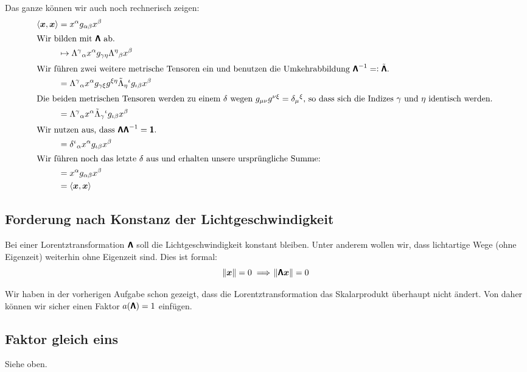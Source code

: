 Das ganze können wir auch noch rechnerisch zeigen:
\begin{align*}
	\inner{\vec x}{\vec x}
	&= x^\alpha g_{\alpha \beta} x^\beta \\
	\intertext{Wir bilden mit $\tens \Lambda$ ab.}
	&\mapsto \Lambda^\gamma{}_\alpha x^\alpha g_{\gamma \eta}
	\Lambda^\eta{}_\beta x^\beta \\
	\intertext{%
		Wir führen zwei weitere metrische Tensoren ein und benutzen die
		Umkehrabbildung $\tens \Lambda^{-1} =: \tilde{\tens \Lambda}$.
	}
	&= \Lambda^\gamma{}_\alpha x^\alpha g_{\gamma \xi} g^{\xi \eta}
	\tilde\Lambda_\eta{}^\iota g_{\iota\beta} x^\beta \\
	\intertext{%
		Die beiden metrischen Tensoren werden zu einem $\delta$ wegen
		$g_{\mu\nu} g^{\nu\xi} = \delta_\mu{}^\xi$, so dass sich die Indizes
		$\gamma$ und $\eta$ identisch werden.
	}
	&= \Lambda^\gamma{}_\alpha x^\alpha \tilde\Lambda_\gamma{}^\iota
	g_{\iota\beta} x^\beta \\
	\intertext{%
		Wir nutzen aus, dass $\tens \Lambda \tens \Lambda^{-1} = \tens 1$.
	}
	&= \delta^\iota{}_\alpha x^\alpha g_{\iota\beta} x^\beta \\
	\intertext{%
		Wir führen noch das letzte $\delta$ aus und erhalten unsere
		ursprüngliche Summe:
	}
	&= x^\alpha g_{\alpha\beta} x^\beta \\
	&= \inner{\vec x}{\vec x}
\end{align*}

\subsection{Forderung nach Konstanz der Lichtgeschwindigkeit}

Bei einer Lorentztransformation $\boldsymbol{\mathsf{\Lambda}}$ soll die Lichtgeschwindigkeit
konstant bleiben. Unter anderem wollen wir, dass lichtartige Wege (ohne
Eigenzeit) weiterhin ohne Eigenzeit sind. Dies ist formal:
\[
	\norm{\boldsymbol{x}} = 0 \implies \norm{\boldsymbol{\mathsf{\Lambda}} \boldsymbol{x}} = 0
\]

Wir haben in der vorherigen Aufgabe schon gezeigt, dass die
Lorentztransformation das Skalarprodukt überhaupt nicht ändert. Von daher
können wir sicher einen Faktor $a(\boldsymbol{\mathsf{\Lambda}}) = 1$ einfügen.

\subsection{Faktor gleich eins}

Siehe oben.


